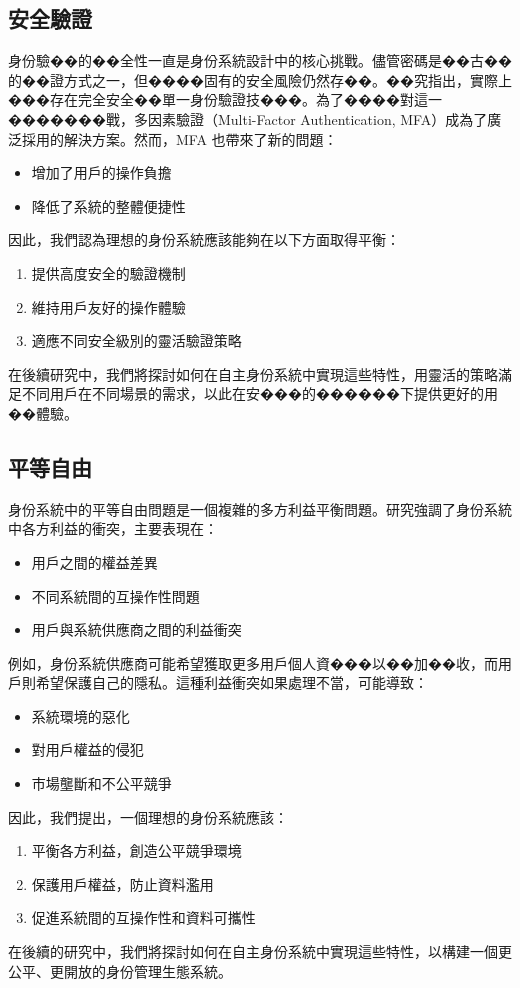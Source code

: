 \subsection{安全驗證}
身份驗��的��全性一直是身份系統設計中的核心挑戰。儘管密碼是��古��的��證方式之一，但����固有的安全風險仍然存��。��究\cite{6234436}指出，實際上���存在完全安全��單一身份驗證技���。為了����對這一�������戰，多因素驗證（Multi-Factor Authentication, MFA）成為了廣泛採用的解決方案。然而，MFA 也帶來了新的問題：
\begin{itemize}
  \item 增加了用戶的操作負擔
  \item 降低了系統的整體便捷性
\end{itemize}
因此，我們認為理想的身份系統應該能夠在以下方面取得平衡：
\begin{enumerate}
  \item 提供高度安全的驗證機制
  \item 維持用戶友好的操作體驗
  \item 適應不同安全級別的靈活驗證策略
\end{enumerate}
在後續研究中，我們將探討如何在自主身份系統中實現這些特性，用靈活的策略滿足不同用戶在不同場景的需求，以此在安���的������下提供更好的用��體驗。
\subsection{平等自由}
身份系統中的平等自由問題是一個複雜的多方利益平衡問題。研究\cite{preukschat2021self}強調了身份系統中各方利益的衝突，主要表現在：
\begin{itemize}
  \item 用戶之間的權益差異
  \item 不同系統間的互操作性問題
  \item 用戶與系統供應商之間的利益衝突
\end{itemize}
例如，身份系統供應商可能希望獲取更多用戶個人資���以��加��收，而用戶則希望保護自己的隱私。這種利益衝突如果處理不當，可能導致：
\begin{itemize}
  \item 系統環境的惡化
  \item 對用戶權益的侵犯
  \item 市場壟斷和不公平競爭
\end{itemize}
因此，我們提出，一個理想的身份系統應該：
\begin{enumerate}
  \item 平衡各方利益，創造公平競爭環境
  \item 保護用戶權益，防止資料濫用
  \item 促進系統間的互操作性和資料可攜性
\end{enumerate}
在後續的研究中，我們將探討如何在自主身份系統中實現這些特性，以構建一個更公平、更開放的身份管理生態系統。
